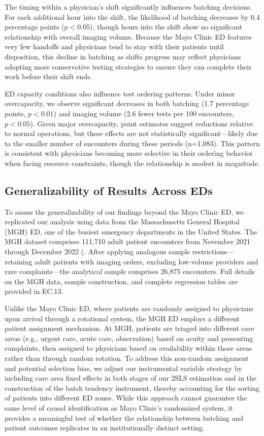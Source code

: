 \documentclass[,,blindrev]{informs}
\begin{document}
The timing within a physician's shift significantly influences batching
decisions. For each additional hour into the shift, the likelihood of
batching decreases by 0.4 percentage points (\(p<0.05\)), though hours
into the shift show no significant relationship with overall imaging
volume. Because the Mayo Clinic ED features very few handoffs and
physicians tend to stay with their patients until disposition, this
decline in batching as shifts progress may reflect physicians adopting
more conservative testing strategies to ensure they can complete their
work before their shift ends.

ED capacity conditions also influence test ordering patterns. Under
minor overcapacity, we observe significant decreases in both batching
(1.7 percentage points, \(p<0.01\)) and imaging volume (2.6 fewer tests
per 100 encounters, \(p<0.05\)). Given major overcapacity, point
estimates suggest reductions relative to normal operations, but these
effects are not statistically significant---likely due to the smaller
number of encounters during these periods (n=1,083). This pattern is
consistent with physicians becoming more selective in their ordering
behavior when facing resource constraints, though the relationship is
modest in magnitude.

\subsection{Generalizability of Results Across
EDs}\label{sec:generalize}

To assess the generalizability of our findings beyond the Mayo Clinic
ED, we replicated our analysis using data from the Massachusetts General
Hospital (MGH) ED, one of the busiest emergency departments in the
United States. The MGH dataset comprises 111,710 adult patient
encounters from November 2021 through December 2022 (. After applying
analogous sample restrictions---retaining adult patients with imaging
orders, excluding low-volume providers and rare complaints---the
analytical sample comprises 26,875 encounters. Full details on the MGH
data, sample construction, and complete regression tables are provided
in EC.13.

Unlike the Mayo Clinic ED, where patients are randomly assigned to
physicians upon arrival through a rotational system, the MGH ED employs
a different patient assignment mechanism. At MGH, patients are triaged
into different care areas (e.g., urgent care, acute care, observation)
based on acuity and presenting complaints, then assigned to physicians
based on availability within those areas rather than through random
rotation. To address this non-random assignment and potential selection
bias, we adjust our instrumental variable strategy by including care
area fixed effects in both stages of our 2SLS estimation and in the
construction of the batch tendency instrument, thereby accounting for
the sorting of patients into different ED zones. While this approach
cannot guarantee the same level of causal identification as Mayo
Clinic's randomized system, it provides a meaningful test of whether the
relationship between batching and patient outcomes replicates in an
institutionally distinct setting.
\end{document}
